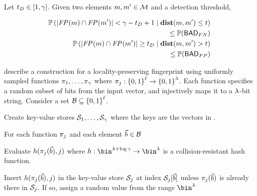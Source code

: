 \begin{corollary}
\label{corr:fingerprint_intersection}
Let $t_{D} \in [1, \gamma]$. Given two elements $\genericMetricSpaceElmt, \genericMetricSpaceElmtAlt \in \metricSpace$ and a detection threshold, 

\begin{align*}
\cprob{}{|\fingerprint{}(\genericMetricSpaceElmt) \cap \fingerprint{}(\genericMetricSpaceElmtAlt)| < \numProjections - \detectionThreshold + 1}{\distanceNotation[\distance][\genericMetricSpaceElmt][\genericMetricSpaceElmtAlt] \le \threshold} 
\\ \le \prob{\badFN} \\
\cprob{}{|\fingerprint{}(\genericMetricSpaceElmt) \cap \fingerprint{}(\genericMetricSpaceElmtAlt)| \ge  \detectionThreshold}{\distanceNotation[\distance][\genericMetricSpaceElmt][\genericMetricSpaceElmtAlt] > \threshold} 
\\ \le \prob{\badFP} \\
\end{align*}

\end{corollary}
\fi 

%
\citet{chongchitmate2024approximate} describe a construction for a locality-preserving fingerprint  using uniformly sampled functions $\projFn[1], \dots, 
\projFn[\numProjections]$ where $\projFn[\projIdx]: \setDefn{0,1}^{\genericVecLen} \rightarrow 
\setDefn{0,1}^{\secParam}$. Each function specifies a random subset of bits from the input 
vector, and injectively maps it to a $\lambda$-bit string. Consider a set
$\blocklist \subseteq \setDefn{0,1}^{\genericVecLen}$.

\enumListStart
\item Create \numProjections key-value stores $\projBuckets[1], \dots, \projBuckets[\numProjections]$ where the keys are the vectors in \blocklist.
\item For each function $\projFn[\projIdx]$ and each element $\blocklistVec \in \blocklist$
\enumListStart
\item Evaluate  $\hashFn(\projFn[\projIdx](\blocklistVec), \projIdx)$ where $\hashFn: \bin^{\secParam + \log \numProjections} \rightarrow \bin^{\secParam}$ is a collision-resistant hash function. 
\item Insert $\hashFn(\projFn[\projIdx](\blocklistVec), \projIdx)$  in the key-value store $\projBuckets[\projIdx]$ at index $\projBuckets[\projIdx][\blocklistVec]$ unless $\projFn[\projIdx](\blocklistVec)$ is already there in $\projBuckets[\projIdx]$. If so, assign a random value from the range $\bin^{\secParam}$
\enumListEnd
\enumListEnd

